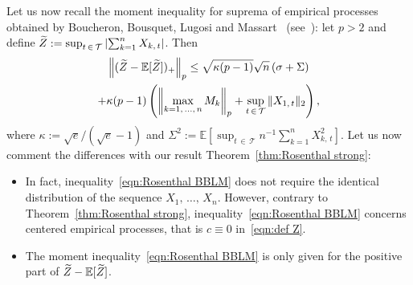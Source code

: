 \documentclass[AHL,Unicode,longabstracts,published]{cedram}
\newcommand{\bE}{\mathbb{E}}
\newcommand{\cT}{\mathcal{T}}
\let\oldtilde\tilde
\renewcommand*{\tilde}[1]{\mathchoice{\widetilde{#1}}{\widetilde{#1}}{\oldtilde{#1}}{\oldtilde{#1}}}
\begin{document}
Let us now recall the moment inequality for suprema of empirical processes obtained by Boucheron, Bousquet, Lugosi and Massart~\cite{BBLM05} (see~\cite[Theorems~15.14 and 15.5]{BLM13}): let $p>2$ and define $\tilde Z:=\sup_{t\,\in\,\cT}\left|\sum_{k=1}^nX_{k,\,t}\right|$. Then
\begin{multline}\label{eqn:Rosenthal BBLM}
\left\|(\tilde Z-\bE[\tilde Z])_+\right\|_p\leq \sqrt{\kappa(p-1)}\sqrt{n}\left(\sigma+\Sigma\right)\\
+\kappa(p-1)\left(\left\|\max_{k=1,\,\ldots,\,n}M_k\right\|_p+\sup_{t\,\in\,\cT}\|X_{1,\,t}\|_2\right),
\end{multline}
where $\kappa:=\sqrt{e}/(\sqrt{e}-1)$ and $\Sigma^2:=\bE[\sup_{t\,\in\,\cT}n^{-1}\sum_{k=1}^nX_{k,\,t}^2]$. Let us now comment the differences with our result Theorem~\ref{thm:Rosenthal strong}:
\begin{itemize}
\item In fact, inequality~\eqref{eqn:Rosenthal BBLM} does not require the identical distribution of the sequence $X_1,\,\ldots,\,X_n$. However, contrary to Theorem~\ref{thm:Rosenthal strong}, inequality~\eqref{eqn:Rosenthal BBLM} concerns centered empirical processes, that is $c\equiv 0$ in~\eqref{eqn:def Z}.
\item The moment inequality~\eqref{eqn:Rosenthal BBLM} is only given for the positive part of $\tilde Z-\bE[\tilde Z]$.


\end{itemize}
\end{document}
